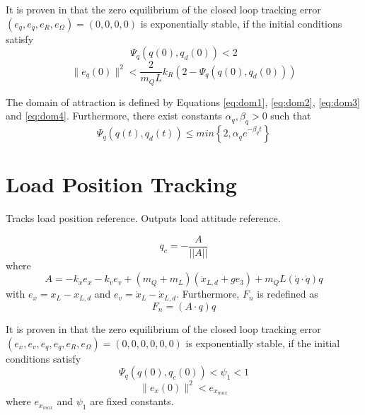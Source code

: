 It is proven in \cite{Sreenath2013c} that the zero equilibrium of the closed loop tracking error $ (e_q,e_{\dot{q}},e_R,e_\Omega)=(0,0,0,0) $ is exponentially stable, if the initial conditions satisfy
\begin{equation}\label{eq:dom3}
\Psi_q(q(0),q_d(0))<2
\end{equation}
\begin{equation}\label{eq:dom4}
\parallel e_{\dot{q}}(0)\parallel^2<\frac{2}{m_QL}{k_R}(2-\Psi_q(q(0),q_d(0)))
\end{equation}

The domain of attraction is defined by Equations \ref{eq:dom1}, \ref{eq:dom2}, \ref{eq:dom3} and \ref{eq:dom4}.
Furthermore, there exist constants $ \alpha_q,\beta_q>0 $ such that
\begin{equation}\label{eq:con.Psiqconv}
\Psi_q(q(t),q_d(t)) \leq min\left\lbrace 2,\alpha_qe^{-\beta_qt}\right\rbrace 
\end{equation}

\section{Load Position Tracking}\label{sec:con.loadpos}


Tracks load position reference. Outputs load attitude reference.

\begin{equation}\label{eq:con.q}
q_c = - \frac{A}{||A||}
\end{equation}
where
\begin{equation}\label{key}
A = -k_xe_x-k_ve_v+(m_Q+m_L)(\ddot{x}_{L,d}+ge_3)+m_QL(\dot{q}\cdot\dot{q})q
\end{equation}
with $ e_x=x_L-x_{L,d} $ and $ e_v=\dot{x}_L-\dot{x}_{L,d} $.
Furthermore, $ F_n $ is redefined as
\begin{equation}\label{key}
F_n=(A\cdot q)q
\end{equation}

It is proven in \cite{Sreenath2013c} that the zero equilibrium of the closed loop tracking error $ (e_x,e_v,e_q,e_{\dot{q}},e_R,e_\Omega)=(0,0,0,0,0,0) $ is exponentially stable, if the initial conditions satisfy
\begin{equation}\label{eq:dom5}
\Psi_q(q(0),q_c(0))<\psi_1<1
\end{equation}
\begin{equation}
\parallel e_{x}(0)\parallel^2<e_{x_{max}}
\end{equation}
where $ e_{x_{max}} $ and $ \psi_1 $ are fixed constants. 

